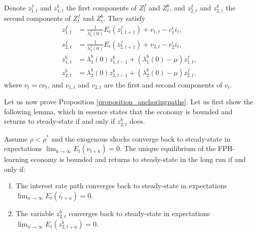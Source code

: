 Denote $z^f_{1,t}$ and $z^b_{1,t}$ the first components of $Z^f_t$ and $Z^b_t$, and $z^f_{2,t}$ and $z^b_{2,t}$ the second components of $Z^f_t$ and $Z^b_t$. They satisfy
\begin{align}
z^f_{1,t} &= \frac{1}{\lambda^f_1(0)} E_t(z^f_{1,t+1}) + v_{1,t} - c^i_1 i_t,\label{eq_z1tilde}\\
z^f_{2,t} &= \frac{1}{\lambda^f_2(0)} E_t(z^f_{2,t+1}) + v_{2,t} - c^i_2 i_t,\label{eq_z2tilde}\\
z^b_{1,t} &= \lambda^b_1(0) z^b_{1,t-1} + (\lambda^b_1(0)-\mu) z^f_{1,t},\label{eq_z1bar}\\
z^b_{2,t} &= \lambda^b_2(0) z^b_{2,t-1} + (\lambda^b_2(0)-\mu) z^f_{2,t},\label{eq_z2bar}
\end{align}
where $v_t = c \nu_t$, and $v_{1,t}$ and $v_{2,t}$ are the first and second components of $v_t$.

Let us now prove Proposition \ref{proposition_anchoringpaths}. Let us first show the following lemma, which in essence states that the economy is bounded and returns to steady-state if and only if $z_{2,t}^b$ does.

\begin{lemma}\label{lemma:proofstep1}
Assume $\rho<\rho^*$ and the exogenous shocks converge back to steady-state in expectations $\lim_{k \rightarrow \infty} E_t(\nu_{t+k})=0$. The unique equilibrium of the FPH-learning economy is bounded and returns to steady-state in the long run if and only if:
\begin{enumerate}[label=(\roman*)]
	\item The interest rate path converges back to steady-state in expectations $\lim_{n \rightarrow \infty} E_t(i_{t+n})=0$.
	\item The variable $z^b_{2,t}$ converges back to steady-state in expectations $\lim_{n \rightarrow \infty} E_t(z^b_{2,t+n})=0$.
\end{enumerate}
\end{lemma}

